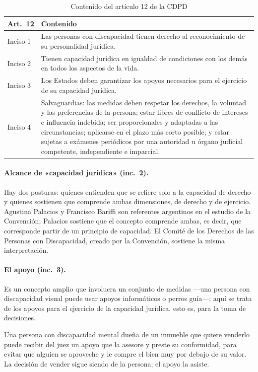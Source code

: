 \documentclass[12pt,oneside]{book}
\begin{document}
\begin{table}[H]
\centering
\begin{tabularx}{\textwidth}{B{0.14\textwidth} Y}
\toprule
\textbf{Art.~12} & \textbf{Contenido} \\
\midrule
Inciso 1 & Las personas con discapacidad tienen derecho al reconocimiento de su personalidad jurídica. \\
Inciso 2 & Tienen capacidad jurídica en igualdad de condiciones con los demás en todos los aspectos de la vida. \\
Inciso 3 & Los Estados deben garantizar los apoyos necesarios para el ejercicio de su capacidad jurídica. \\
Inciso 4 & Salvaguardias: las medidas deben respetar los derechos, la voluntad y las preferencias de la persona; estar libres de conflicto de intereses e influencia indebida; ser proporcionales y adaptadas a las circunstancias; aplicarse en el plazo más corto posible; y estar sujetas a exámenes periódicos por una autoridad u órgano judicial competente, independiente e imparcial. \\
\bottomrule
\end{tabularx}
\caption{Contenido del artículo 12 de la CDPD}
\end{table}

\paragraph{Alcance de «capacidad jurídica» (inc.~2).} Hay dos posturas: quienes entienden que se refiere solo a la capacidad de derecho y quienes sostienen que comprende ambas dimensiones, de derecho y de ejercicio. Agustina Palacios y Francisco Bariffi son referentes argentinos en el estudio de la Convención; Palacios sostiene que el concepto comprende ambas, es decir, que corresponde partir de un principio de capacidad. El Comité de los Derechos de las Personas con Discapacidad, creado por la Convención, sostiene la misma interpretación.

\paragraph{El apoyo (inc.~3).} Es un concepto amplio que involucra un conjunto de medidas ---una persona con discapacidad visual puede usar apoyos informáticos o perros guía---; aquí se trata de los apoyos para el ejercicio de la capacidad jurídica, esto es, para la toma de decisiones.

\begin{ejemplo}
Una persona con discapacidad mental dueña de un inmueble que quiere venderlo puede recibir del juez un apoyo que la asesore y preste su conformidad, para evitar que alguien se aproveche y le compre el bien muy por debajo de su valor. La decisión de vender sigue siendo de la persona; el apoyo la asiste.
\end{ejemplo}
\end{document}
